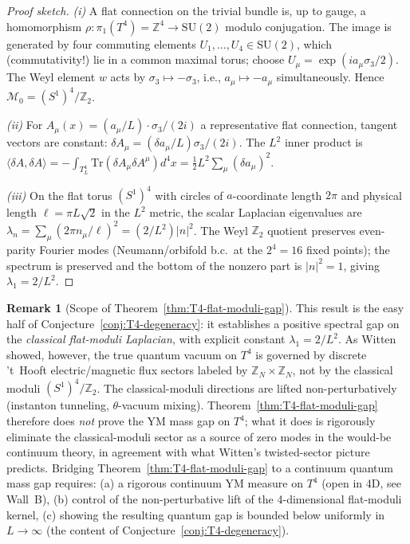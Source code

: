 \documentclass[11pt,letterpaper]{article}
\theoremstyle{definition}
\newtheorem{remark}[theorem]{Remark}
\newcommand{\bbZ}{\mathbb{Z}}
\newcommand{\cM}{\mathcal{M}}
\newcommand{\Tr}{\mathrm{Tr}}
\begin{document}
\begin{proof}[Proof sketch]
\emph{(i)} A flat connection on the trivial bundle is, up to gauge, a homomorphism $\rho : \pi_1(T^4) = \bbZ^4 \to \mathrm{SU}(2)$ modulo conjugation. The image is generated by four commuting elements $U_1, \ldots, U_4 \in \mathrm{SU}(2)$, which (commutativity!) lie in a common maximal torus; choose $U_\mu = \exp(i a_\mu \sigma_3/2)$. The Weyl element $w$ acts by $\sigma_3 \mapsto -\sigma_3$, i.e., $a_\mu \mapsto -a_\mu$ simultaneously. Hence $\cM_0 = (S^1)^4/\bbZ_2$.

\emph{(ii)} For $A_\mu(x) = (a_\mu/L)\cdot\sigma_3/(2i)$ a representative flat connection, tangent vectors are constant: $\delta A_\mu = (\delta a_\mu/L)\sigma_3/(2i)$. The $L^2$ inner product is $\langle\delta A, \delta A\rangle = -\int_{T^4_L} \Tr(\delta A_\mu \delta A^\mu) d^4 x = \tfrac{1}{2} L^2 \sum_\mu (\delta a_\mu)^2$.

\emph{(iii)} On the flat torus $(S^1)^4$ with circles of $a$-coordinate length $2\pi$ and physical length $\ell = \pi L \sqrt{2}$ in the $L^2$ metric, the scalar Laplacian eigenvalues are $\lambda_n = \sum_\mu (2\pi n_\mu / \ell)^2 = (2/L^2)|n|^2$. The Weyl $\bbZ_2$ quotient preserves even-parity Fourier modes (Neumann/orbifold b.c.\ at the $2^4 = 16$ fixed points); the spectrum is preserved and the bottom of the nonzero part is $|n|^2 = 1$, giving $\lambda_1 = 2/L^2$.
\end{proof}

\begin{remark}[Scope of Theorem~\ref{thm:T4-flat-moduli-gap}]\label{rmk:T4-classical-vs-quantum}
This result is the easy half of Conjecture~\ref{conj:T4-degeneracy}: it establishes a positive spectral gap on the \emph{classical flat-moduli Laplacian}, with explicit constant $\lambda_1 = 2/L^2$. As Witten \cite{Witten1982} showed, however, the true quantum vacuum on $T^4$ is governed by discrete 't~Hooft electric/magnetic flux sectors labeled by $\bbZ_N \times \bbZ_N$, not by the classical moduli $(S^1)^4/\bbZ_2$. The classical-moduli directions are lifted non-perturbatively (instanton tunneling, $\theta$-vacuum mixing). Theorem~\ref{thm:T4-flat-moduli-gap} therefore does \emph{not} prove the YM mass gap on $T^4$; what it does is rigorously eliminate the classical-moduli sector as a source of zero modes in the would-be continuum theory, in agreement with what Witten's twisted-sector picture predicts. Bridging Theorem~\ref{thm:T4-flat-moduli-gap} to a continuum quantum mass gap requires: (a) a rigorous continuum YM measure on $T^4$ (open in 4D, see Wall~B), (b) control of the non-perturbative lift of the 4-dimensional flat-moduli kernel, (c) showing the resulting quantum gap is bounded below uniformly in $L\to\infty$ (the content of Conjecture~\ref{conj:T4-degeneracy}).
\end{remark}
\end{document}
